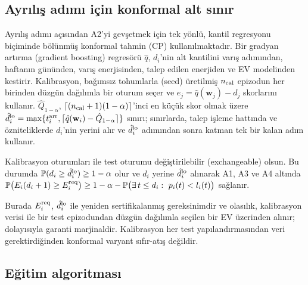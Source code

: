 \subsection{Ayrılış adımı için konformal alt sınır}\label{sec:conformal}

Ayrılış adımı açısından A2'yi gevşetmek için tek yönlü, kantil regresyonu biçiminde \cite{romano2019conformalized} bölünmüş konformal tahmin (CP) \cite{papadopoulos2002inductive,vovk2022algorithmic,lei2018distributionfree,angelopoulos2023conformal} kullanılmaktadır.
Bir gradyan artırma (gradient boosting) regresörü $\hat q$, $d_i$'nin alt kantilini varış adımından, haftanın gününden, varış enerjisinden, talep edilen enerjiden ve EV modelinden kestirir.
Kalibrasyon, bağımsız tohumlarla (seed) üretilmiş $n_{\mathrm{cal}}$ epizodun her birinden düzgün dağılımla bir oturum seçer ve $e_j=\hat q(\mathbf w_j)-d_j$ skorlarını kullanır.
$\hat Q_{1-\alpha}$, $\lceil(n_{\mathrm{cal}}+1)(1-\alpha)\rceil$'inci en küçük skor olmak üzere $\hat d_i^{\mathrm{lo}}=\max\{t_i^{\mathrm{arr}},\lceil\hat q(\mathbf w_i)-\hat Q_{1-\alpha}\rceil\}$ sınırı; sınırlarda, talep işleme hattında ve özniteliklerde $d_i$'nin yerini alır ve $\hat d_i^{\mathrm{lo}}$ adımından sonra katman tek bir kalan adım kullanır.

\begin{proposition}\label{prop:conformal}
Kalibrasyon oturumları ile test oturumu değiştirilebilir (exchangeable) olsun.
Bu durumda $\mathbb P(d_i\ge\hat d_i^{\mathrm{lo}})\ge1-\alpha$ olur ve $d_i$ yerine $\hat d_i^{\mathrm{lo}}$ alınarak A1, A3 ve A4 altında $\mathbb P\big(E_i(d_i+1)\ge E^{\mathrm{req}}_i\big)\ge1-\alpha-\mathbb P\big(\exists\,t\le d_i:\ p_i(t)<l_i(t)\big)$ sağlanır.
\end{proposition}

Burada $E^{\mathrm{req}}_i$, $\hat d_i^{\mathrm{lo}}$ ile yeniden sertifikalanmış gereksinimdir ve olasılık, kalibrasyon verisi ile bir test epizodundan düzgün dağılımla seçilen bir EV üzerinden alınır; dolayısıyla garanti marjinaldir.
Kalibrasyon her test yapılandırmasından veri gerektirdiğinden konformal varyant sıfır-atış değildir.

\subsection{Eğitim algoritması}\label{sec:training}

